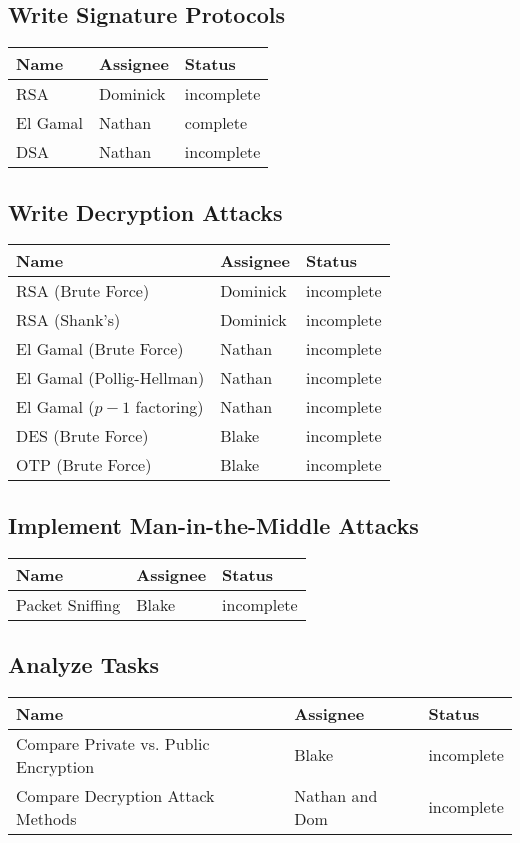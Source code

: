 \documentclass[12pt]{report}
\begin{document}
\subsection{Write Signature Protocols}
\begin{tabular}{l|l|l}
    Name & Assignee & Status \\ \hline
    RSA & Dominick & incomplete \\
    El Gamal & Nathan & complete \\
    DSA & Nathan & incomplete	 
\end{tabular}

\subsection{Write Decryption Attacks}
\begin{tabular}{l|l|l}
    Name & Assignee & Status \\ \hline
    RSA (Brute Force) & Dominick & incomplete \\
    RSA (Shank's) & Dominick & incomplete \\
    El Gamal (Brute Force) & Nathan & incomplete \\
    El Gamal (Pollig-Hellman) & Nathan & incomplete \\
    El Gamal ($p-1$ factoring) & Nathan & incomplete \\
    DES (Brute Force) & Blake & incomplete \\
    OTP (Brute Force) & Blake & incomplete 
\end{tabular}

\subsection{Implement Man-in-the-Middle Attacks}
\begin{tabular}{l|l|l}
    Name & Assignee & Status \\ \hline
    Packet Sniffing & Blake & incomplete 
\end{tabular}

\subsection{Analyze Tasks}
\begin{tabular}{l|l|l}
    Name & Assignee & Status \\ \hline
    Compare Private vs. Public Encryption & Blake & incomplete \\
    Compare Decryption Attack Methods & Nathan and Dom & incomplete
\end{tabular}
\end{document}
